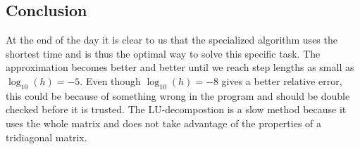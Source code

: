 \documentclass[12pt,a4paper]{article}
\begin{document}
\subsection*{Conclusion}
At the end of the day it is clear to us that the specialized algorithm uses the shortest time and is thus the optimal way to solve this specific task. The approximation becomes better and better until we reach step lengths as small as $\log_{10}(h) = -5$. Even though $\log_{10}(h) = -8$ gives a better relative error, this could be because of something wrong in the program and should be double checked before it is trusted. The LU-decompostion is a slow method because it uses the whole matrix and does not take advantage of the properties of a tridiagonal matrix.
\end{document}
